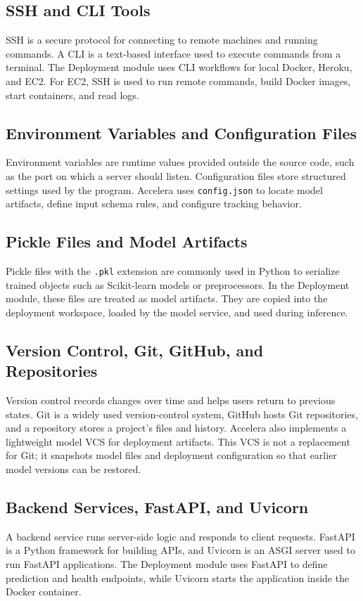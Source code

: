 \documentclass[12pt,a4paper]{report}
\begin{document}
\subsection{SSH and CLI Tools}
SSH is a secure protocol for connecting to remote machines and running commands.
A CLI is a text-based interface used to execute commands from a terminal. The
Deployment module uses CLI workflows for local Docker, Heroku, and EC2. For
EC2, SSH is used to run remote commands, build Docker images, start containers,
and read logs.

\subsection{Environment Variables and Configuration Files}
Environment variables are runtime values provided outside the source code, such
as the port on which a server should listen. Configuration files store structured
settings used by the program. Accelera uses \texttt{config.json} to locate model
artifacts, define input schema rules, and configure tracking behavior.

\subsection{Pickle Files and Model Artifacts}
Pickle files with the \texttt{.pkl} extension are commonly used in Python to
serialize trained objects such as Scikit-learn models or preprocessors. In the
Deployment module, these files are treated as model artifacts. They are copied
into the deployment workspace, loaded by the model service, and used during
inference.

\subsection{Version Control, Git, GitHub, and Repositories}
Version control records changes over time and helps users return to previous
states. Git is a widely used version-control system, GitHub hosts Git
repositories, and a repository stores a project's files and history. Accelera
also implements a lightweight model VCS for deployment artifacts. This VCS is
not a replacement for Git; it snapshots model files and deployment
configuration so that earlier model versions can be restored.

\subsection{Backend Services, FastAPI, and Uvicorn}
A backend service runs server-side logic and responds to client requests.
FastAPI is a Python framework for building APIs, and Uvicorn is an ASGI server
used to run FastAPI applications. The Deployment module uses FastAPI to define
prediction and health endpoints, while Uvicorn starts the application inside
the Docker container.
\end{document}
